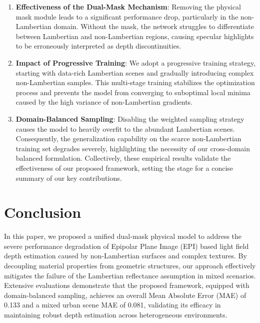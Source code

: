 \documentclass[lettersize,journal]{IEEEtran}
\begin{document}
\begin{enumerate}
\item \textbf{Effectiveness of the Dual-Mask Mechanism}: Removing the physical mask module leads to a significant performance drop, particularly in the non-Lambertian domain. Without the mask, the network struggles to differentiate between Lambertian and non-Lambertian regions, causing specular highlights to be erroneously interpreted as depth discontinuities.
\item \textbf{Impact of Progressive Training}: We adopt a progressive training strategy, starting with data-rich Lambertian scenes and gradually introducing complex non-Lambertian samples. This multi-stage training stabilizes the optimization process and prevents the model from converging to suboptimal local minima caused by the high variance of non-Lambertian gradients.
\item \textbf{Domain-Balanced Sampling}: Disabling the weighted sampling strategy causes the model to heavily overfit to the abundant Lambertian scenes. Consequently, the generalization capability on the scarce non-Lambertian training set degrades severely, highlighting the necessity of our cross-domain balanced formulation. Collectively, these empirical results validate the effectiveness of our proposed framework, setting the stage for a concise summary of our key contributions.
\end{enumerate}

\section{Conclusion}

In this paper, we proposed a unified dual-mask physical model to address the severe performance degradation of Epipolar Plane Image (EPI) based light field depth estimation caused by non-Lambertian surfaces and complex textures. By decoupling material properties from geometric structures, our approach effectively mitigates the failure of the Lambertian reflectance assumption in mixed scenarios. Extensive evaluations demonstrate that the proposed framework, equipped with domain-balanced sampling, achieves an overall Mean Absolute Error (MAE) of 0.133 and a mixed urban scene MAE of 0.081, validating its efficacy in maintaining robust depth estimation across heterogeneous environments.
\end{document}
